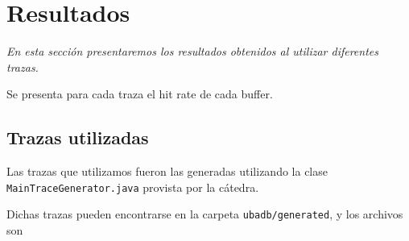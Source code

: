 \section{Resultados}

\textsl{En esta secci\'on presentaremos los resultados obtenidos 
al utilizar diferentes trazas.}

\vspace*{0.3cm}

Se presenta para cada traza el hit rate de cada buffer.

\subsection{Trazas utilizadas}

Las trazas que utilizamos fueron las generadas utilizando la
clase \texttt{MainTraceGenerator.java} provista por la cátedra.

            
            
            


Dichas trazas pueden encontrarse en la carpeta 
\texttt{ubadb/generated}, y los archivos son
